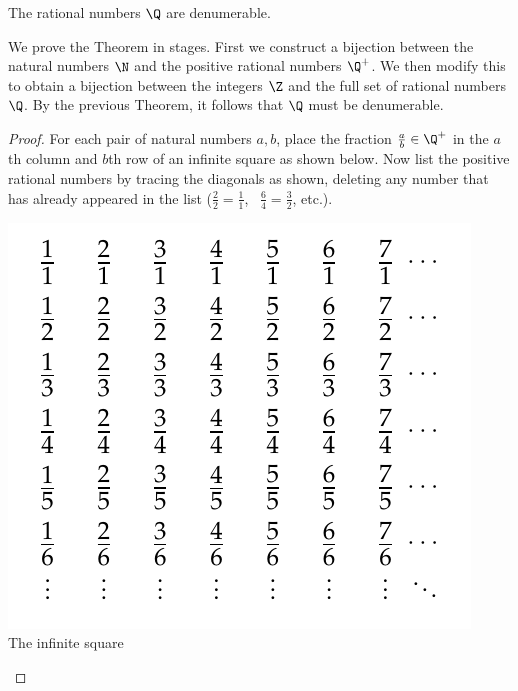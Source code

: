 \begin{thm}\label{thm:qcount}
The rational numbers $\Q$ are denumerable.
\end{thm}

\noindent We prove the Theorem in stages. First we construct a bijection between the natural numbers $\N$ and the positive rational numbers $\Q^+$. We then modify this to obtain a bijection between the integers $\Z$ and the full set of rational numbers $\Q$. By the previous Theorem, it follows that $\Q$ must be denumerable.

\begin{proof}
For each pair of natural numbers $a,b$, place the fraction $\frac ab\in\Q^+$ in the $a$th column and $b$th row of an infinite square as shown below. Now list the positive rational numbers by tracing the diagonals as shown, deleting any number that has already appeared in the list ($\frac 22=\frac 11$, \ $\frac 64=\frac 32$, etc.).
\begin{center}
\begin{minipage}{0.38\textwidth}\centering
\includegraphics[width=\textwidth]{cardinality-01-qcount}\\
The infinite square
\end{minipage}\qquad\qquad\qquad
\begin{minipage}{0.38\textwidth}\centering

\end{minipage}
\end{center}
\end{proof}
